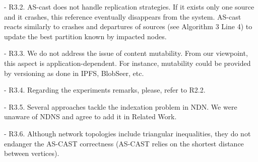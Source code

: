 - R3.2. AS-cast does not handle replication strategies. If it exists only one source and it crashes, this reference eventually disappears from the system. AS-cast reacts similarly to crashes and departures of sources (see Algorithm 3 Line 4) to update the best partition known by impacted nodes. 

- R3.3. We do not  address the issue of content mutability.
From our viewpoint, this aspect is application-dependent. For instance, mutability could be provided by versioning as done in IPFS, BlobSeer, etc.

- R3.4. Regarding the experiments remarks, please, refer to R2.2.

- R3.5. Several approaches tackle the indexation problem in NDN. We were unaware of NDNS and agree to add it in Related Work.

- R3.6. Although network topologies include triangular inequalities,  they do not endanger the AS-CAST correctness (AS-CAST relies on the shortest distance between vertices).

